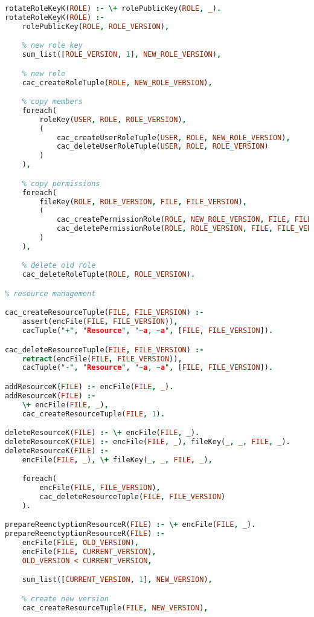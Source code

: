\begin{lstlisting}[language=Prolog]
rotateRoleKeyK(ROLE) :- \+ rolePublicKey(ROLE, _).
rotateRoleKeyK(ROLE) :- 
    rolePublicKey(ROLE, ROLE_VERSION),

    % new role key
    sum_list([ROLE_VERSION, 1], NEW_ROLE_VERSION),

    % new role
    cac_createRoleTuple(ROLE, NEW_ROLE_VERSION),

    % copy members
    foreach(
        roleKey(USER, ROLE, ROLE_VERSION),
        (
            cac_createUserRoleTuple(USER, ROLE, NEW_ROLE_VERSION),
            cac_deleteUserRoleTuple(USER, ROLE, ROLE_VERSION)
        )
    ),

    % copy permissions
    foreach(
        fileKey(ROLE, ROLE_VERSION, FILE, FILE_VERSION),
        (
            cac_createPermissionRole(ROLE, NEW_ROLE_VERSION, FILE, FILE_VERSION),
            cac_deletePermissionRole(ROLE, ROLE_VERSION, FILE, FILE_VERSION)
        )
    ),

    % delete old role
    cac_deleteRoleTuple(ROLE, ROLE_VERSION).

% resource management

cac_createResourceTuple(FILE, FILE_VERSION) :-
    assert(encFile(FILE, FILE_VERSION)),
    cacTuple("+", "Resource", "~a, ~a", [FILE, FILE_VERSION]).

cac_deleteResourceTuple(FILE, FILE_VERSION) :-
    retract(encFile(FILE, FILE_VERSION)),
    cacTuple("-", "Resource", "~a, ~a", [FILE, FILE_VERSION]).

addResourceK(FILE) :- encFile(FILE, _).
addResourceK(FILE) :-
    \+ encFile(FILE, _),
    cac_createResourceTuple(FILE, 1).

deleteResourceK(FILE) :- \+ encFile(FILE, _).
deleteResourceK(FILE) :- encFile(FILE, _), fileKey(_, _, FILE, _).
deleteResourceK(FILE) :-
    encFile(FILE, _), \+ fileKey(_, _, FILE, _),

    foreach(
        encFile(FILE, FILE_VERSION),
        cac_deleteResourceTuple(FILE, FILE_VERSION)
    ).

prepareReenctyptionResourceR(FILE) :- \+ encFile(FILE, _).
prepareReenctyptionResourceR(FILE) :-                                       % the file hasn't already reencrypted
    encFile(FILE, OLD_VERSION), 
    encFile(FILE, CURRENT_VERSION), 
    OLD_VERSION < CURRENT_VERSION,                                          % find versions

    sum_list([CURRENT_VERSION, 1], NEW_VERSION),                               % new version key

    % create new version
    cac_createResourceTuple(FILE, NEW_VERSION),


\end{lstlisting}
